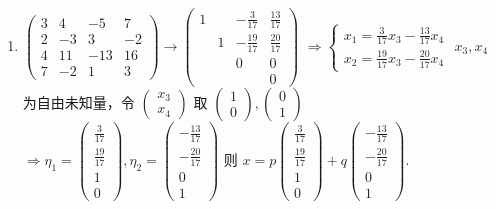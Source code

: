 \begin{enumerate}
			 \item %
			       $\left(\begin{array}{cccc}
					       3 & 4  & -5  & 7  \\
					       2 & -3 & 3   & -2 \\
					       4 & 11 & -13 & 16 \\
					       7 & -2 & 1   & 3
				       \end{array}\right) \to \left(\begin{array}{cccc}
					       1 &   & -\frac{3}{17}  & \frac{13}{17} \\
					         & 1 & -\frac{19}{17} & \frac{20}{17} \\
					         &   & 0              & 0             \\
					         &   &                & 0
				       \end{array}\right)$ $\Rightarrow \begin{cases}
					       x_1 = \frac{3}{17}x_3 - \frac{13}{17}x_4 \\
					       x_2 = \frac{19}{17}x_3 - \frac{20}{17}x_4
				       \end{cases}$
			       $x_3, x_4$ 为自由未知量，令 $\begin{pmatrix}
					       x_3 \\
					       x_4
				       \end{pmatrix}$ 取 $\begin{pmatrix}
					       1 \\
					       0
				       \end{pmatrix}, \begin{pmatrix}
					       0 \\
					       1
				       \end{pmatrix}$ $\Rightarrow \eta_1 = \begin{pmatrix}
					       \frac{3}{17}  \\
					       \frac{19}{17} \\
					       1             \\
					       0
				       \end{pmatrix}, \eta_2 = \begin{pmatrix}
					       -\frac{13}{17} \\
					       -\frac{20}{17} \\
					       0              \\
					       1
				       \end{pmatrix}$
			       则 $x = p\begin{pmatrix}
					       \frac{3}{17}  \\
					       \frac{19}{17} \\
					       1             \\
					       0
				       \end{pmatrix} + q\begin{pmatrix}
					       -\frac{13}{17} \\
					       -\frac{20}{17} \\
					       0              \\
					       1
				       \end{pmatrix}$.


\end{enumerate}
